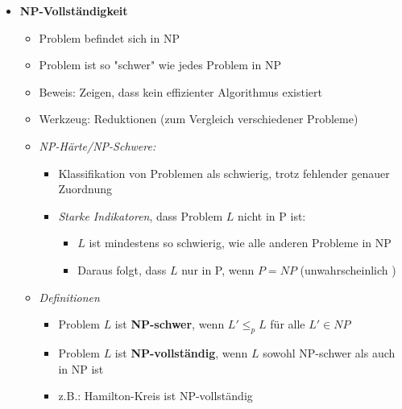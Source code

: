 \begin{itemize}
            \item \textbf{NP-Vollständigkeit}
                \begin{itemize}
                    \item Problem befindet sich in NP
                    \item Problem ist so \string"schwer\string" wie jedes Problem in NP
                    \item Beweis: Zeigen, dass kein effizienter Algorithmus existiert
                    \item Werkzeug: Reduktionen (zum Vergleich verschiedener Probleme)
                    \item \textit{NP-Härte/NP-Schwere:}
                        \begin{itemize}
                            \item Klassifikation von Problemen als schwierig, trotz fehlender genauer Zuordnung
                            \item \textit{Starke Indikatoren}, dass Problem $L$ nicht in P ist:
                                \begin{itemize}
                                    \item $L$ ist mindestens so schwierig, wie alle anderen Probleme in NP
                                    \item Daraus folgt, dass $L$ nur in P, wenn $P=NP$ (unwahrscheinlich )
                                \end{itemize}
                        \end{itemize}
                    \item \textit{Definitionen}
                        \begin{itemize}
                            \item Problem $L$ ist \textbf{NP-schwer}, wenn $L' \leq_p L$ für alle $L' \in NP$
                            \item Problem $L$ ist \textbf{NP-vollständig}, wenn $L$ sowohl NP-schwer als auch in NP ist
                            \item z.B.: Hamilton-Kreis ist NP-vollständig
                        \end{itemize}
                \end{itemize}

\pagebreak


\end{itemize}
